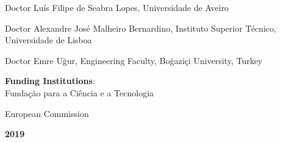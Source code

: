 \begin{titlepage}
Doctor Luís Filipe de Seabra Lopes, Universidade de Aveiro

Doctor Alexandre José Malheiro Bernardino, Instituto Superior Técnico,\\ Universidade de Lisboa

Doctor Emre Uğur, Engineering Faculty, Boğaziçi University, Turkey

\vspace{0.75cm}

\textbf{Funding Institutions}:\\
Fundação para a Ciência e a Tecnologia

European Commission

\vspace{\fill}

\centering
\textbf{2019}
\end{titlepage}

\restoregeometry
